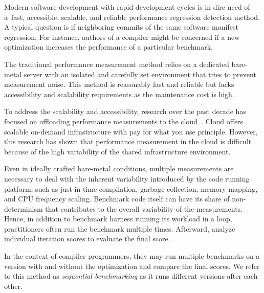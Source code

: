 
Modern software development with rapid development cycles is in dire need of a~fast, accessible, scalable, and reliable performance regression detection method.
A typical question is if neighboring commits of the same software manifest regression.
For instance, authors of a compiler might be concerned if a new optimization increases the performance of a particular benchmark.

The traditional performance measurement method relies on a dedicated bare-metal server with an isolated and carefully set environment that tries to prevent measurement noise.
This method is reasonably fast and reliable but lacks accessibility and scalability requirements as the maintenance cost is high.

To address the scalability and accessibility, research over the past decade has focused on offloading performance measurements to the cloud~\cite{leitner2016patterns, laaber2019software, abedi2017conducting}.
Cloud offers scalable \mbox{on-demand} infrastructure with pay for what you use principle.
However, this research has shown that performance measurement in the cloud is difficult because of the high variability of the shared infrastructure environment.

Even in ideally crafted \mbox{bare-metal} conditions, multiple measurements are necessary to deal with the inherent variability introduced by the code running platform, such as \mbox{just-in-time} compilation, garbage collection, memory mapping, and CPU frequency scaling.
Benchmark code itself can have its share of non-determinism that contributes to the overall variability of the measurements.
Hence, in addition to benchmark harness running its workload in a loop, practitioners often run the benchmark multiple times.
Afterward, analyze individual iteration scores to evaluate the final score.

In the context of compiler programmers, they may run multiple benchmarks on a version with and without the optimization and compare the final scores.
We refer to this method as \emph{sequential benchmarking} as it runs different versions after each other.

